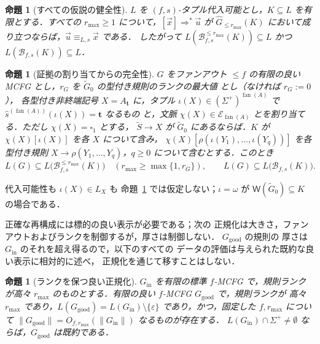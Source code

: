 \documentclass[11pt,a4paper]{ltjsarticle}
\numberwithin{equation}{section}
\theoremstyle{plain}
\newtheorem{proposition}[theorem]{命題}
\theoremstyle{definition}
\theoremstyle{remark}
\newcommand{\Wit}{\mathsf{W}}
\newcommand{\tuple}[1]{\vec{#1}}
\newcommand{\blank}{\square}
\newcommand{\eps}{\varepsilon}
\newcommand{\fan}{\operatorname{fan}}
\theoremstyle{plain}
\begin{document}
\begin{proposition}[すべての仮説の健全性]
\label{prop:reconstruction-soundness}
$L$ を $(f,s)$-タプル代入可能とし，$K\subseteq L$ を有限とする．すべての
$r_{\max}\ge1$ について，$[\tuple x]\Rightarrow^*\tuple u$ が
$\widehat G_{\le r_{\max}}(K)$ において成り立つならば，$\tuple u\equiv_{L,s}\tuple x$ である．
したがって $L(\mathcal B_{f,s}^{\le r_{\max}}(K))\subseteq L$ かつ
$L(\mathcal B_{f,s}(K))\subseteq L$．
\end{proposition}

\begin{proposition}[証拠の割り当てからの完全性]
\label{prop:completeness}
$G$ をファンアウト $\le f$ の有限の良い MCFG とし，$r_G$ を $\widetilde G_0$ の型付き規則のランクの最大値
とし（なければ $r_G:=0$），
各型付き非終端記号 $X=A_{\mathbf t}$ に，タプル
$\iota(X)\in(\Sigma^+)^{\fan(A)}$ で $\widehat s^{(\fan(A))}(\iota(X))=\mathbf t$ なるもの
と，文脈 $\chi(X)\in\mathcal E_{\fan(A)}$ とを割り当てる．ただし $\chi(X)=\blank_1$ とする，
$\widetilde S\to X$ が $\widetilde G_0$ にあるならば．$K$ が
$\chi(X)[\iota(X)]$ を各 $X$ について含み，
$\chi(X)[\rho(\iota(Y_1),\ldots,\iota(Y_q))]$ を各
型付き規則 $X\to\rho(Y_1,\ldots,Y_q)$，$q\ge0$ について含むとする．このとき
\[
 L(G)\subseteq L\bigl(\mathcal B_{f,s}^{\le r_{\max}}(K)\bigr)
 \quad(r_{\max}\ge\max\{1,r_G\}),\qquad
 L(G)\subseteq L\bigl(\mathcal B_{f,s}(K)\bigr).
\]
\end{proposition}

代入可能性も $\iota(X)\in L_X$ も
命題~\ref{prop:completeness} では仮定しない；$\iota=\omega$ が
$\Wit(\widetilde G_0)\subseteq K$ の場合である．

正確な再構成には標的の良い表示が必要である；次の
正規化は大きさ，ファンアウトおよびランクを制御するが，厚さは制御しない．
$G_{\mathrm{good}}$ の規則の
厚さは $G_{\mathrm{in}}$ のそれを超え得るので，以下のすべての
データの評価は与えられた既約な良い表示に相対的に述べ，
正規化を通じて移すことはしない．

\begin{proposition}[ランクを保つ良い正規化]
\label{prop:good-normalization}
$G_{\mathrm{in}}$ を有限の標準 $f$-MCFG で，規則ランクが高々
$r_{\max}$ のものとする．有限の良い $f$-MCFG $G_{\mathrm{good}}$ で，規則ランクが
高々 $r_{\max}$ であり，$L(G_{\mathrm{good}})=L(G_{\mathrm{in}})\setminus\{\eps\}$
であり，かつ，固定した $f,r_{\max}$ について
$\|G_{\mathrm{good}}\|=O_{f,r_{\max}}(\|G_{\mathrm{in}}\|)$ なるものが存在する．
$L(G_{\mathrm{in}})\cap\Sigma^+\ne\emptyset$ ならば，$G_{\mathrm{good}}$ は既約である．
\end{proposition}
\end{document}
